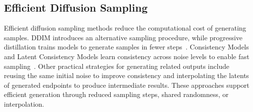 \subsection{Efficient Diffusion Sampling}
Efficient diffusion sampling methods reduce the computational cost
of generating samples. DDIM introduces an alternative sampling
procedure, while progressive distillation trains models to generate
samples in fewer steps~\cite{song2020ddim,salimans2022progressive}.
Consistency Models and Latent Consistency Models learn consistency
across noise levels to enable fast sampling~\cite{song2023consistency,
luo2023latent}. Other practical strategies for generating related
outputs include reusing the same initial noise to improve consistency
and interpolating the latents of generated endpoints to produce
intermediate results. These approaches support efficient generation
through reduced sampling steps, shared randomness, or interpolation.
